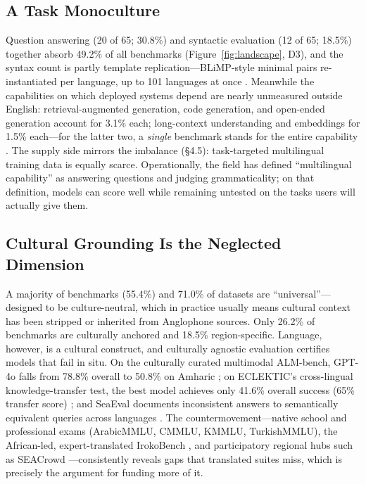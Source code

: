 \documentclass[letterpaper]{article} %
\begin{document}
\subsection{A Task Monoculture}
Question answering (20 of 65; 30.8\%) and syntactic evaluation (12 of 65; 18.5\%) together absorb 49.2\% of all benchmarks (Figure~\ref{fig:landscape}, D3), and the syntax count is partly template replication---BLiMP-style minimal pairs re-instantiated per language, up to 101 languages at once \cite{warstadt2020blimp,jumelet2025multiblimp10massivelymultilingual}. Meanwhile the capabilities on which deployed systems depend are nearly unmeasured outside English: retrieval-augmented generation, code generation, and open-ended generation account for 3.1\% each; long-context understanding and embeddings for 1.5\% each---for the latter two, a \emph{single} benchmark stands for the entire capability \cite{kim2025rulermeasureallbenchmarking,enevoldsen2025mmtebmassivemultilingualtext}. The supply side mirrors the imbalance (\S4.5): task-targeted multilingual training data is equally scarce. Operationally, the field has defined ``multilingual capability'' as answering questions and judging grammaticality; on that definition, models can score well while remaining untested on the tasks users will actually give them.
 
\subsection{Cultural Grounding Is the Neglected Dimension}
A majority of benchmarks (55.4\%) and 71.0\% of datasets are ``universal''---designed to be culture-neutral, which in practice usually means cultural context has been stripped or inherited from Anglophone sources. Only 26.2\% of benchmarks are culturally anchored and 18.5\% region-specific. Language, however, is a cultural construct, and culturally agnostic evaluation certifies models that fail in situ. On the culturally curated multimodal ALM-bench, GPT-4o falls from 78.8\% overall to 50.8\% on Amharic \cite{vayani2025languagesmatterevaluatinglmms}; on ECLEKTIC's cross-lingual knowledge-transfer test, the best model achieves only 41.6\% overall success (65\% transfer score) \cite{goldman2025eclekticnovelchallengeset}; and SeaEval documents inconsistent answers to semantically equivalent queries across languages \cite{wang2024seaevalmultilingualfoundationmodels}. The countermovement---native school and professional exams (ArabicMMLU, CMMLU, KMMLU, TurkishMMLU), the African-led, expert-translated IrokoBench \cite{adelani2024irokobench}, and participatory regional hubs such as SEACrowd \cite{lovenia2024seacrowd}---consistently reveals gaps that translated suites miss, which is precisely the argument for funding more of it.
 
\end{document}
